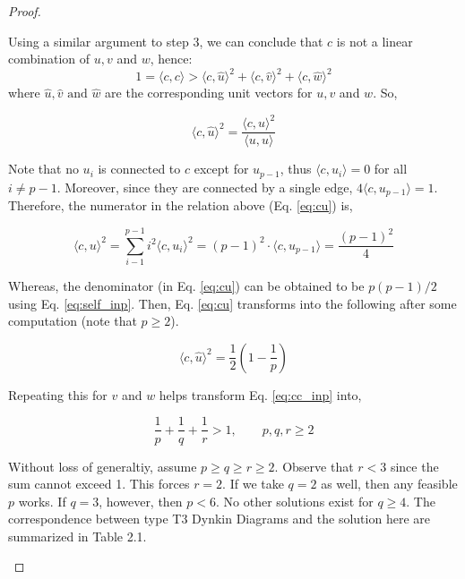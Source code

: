 \begin{proof}
\begin{enumerate}
        Using a similar argument to step 3, we can conclude that $c$ is not a linear combination of $u, v$ and $w$, hence:
        \begin{equation}
            \label{eq:cc_inp}
            1 = \langle c, c \rangle >  \langle c, \hat u \rangle^2 + \langle c, \hat v\rangle^2 + \langle c, \hat w \rangle^2
        \end{equation}
        where $\hat u, \hat v \text{ and } \hat w$ are the corresponding unit vectors for $u, v$ and $w$. So, 

        \begin{equation}
            \label{eq:cu}
            \langle c, \hat u \rangle^2 = \frac{\langle c, u \rangle^2}{\langle u, u \rangle}
        \end{equation}

        Note that no $u_i$ is connected to $c$ except for $u_{p-1}$, thus $ \langle c, u_i \rangle = 0$ for all $i \not= p-1$.
        Moreover, since they are connected by a single edge, $4 \langle c, u_{p-1} \rangle = 1$. Therefore, the numerator in
        the relation above (Eq. \ref{eq:cu}) is,

        \begin{equation*}
            \langle c, u \rangle ^2 = \sum_{i-1}^{p-1} i^2 \langle c, u_i \rangle^2 = (p-1)^2 \cdot \langle c, u_{p-1} \rangle = \frac{(p-1)^2}{4}
        \end{equation*}

        Whereas, the denominator (in Eq. \ref{eq:cu}) can be obtained to be $p(p-1) /2$ using Eq. \ref{eq:self_inp}. Then, 
        Eq. \ref{eq:cu} transforms into the following after some computation (note that $p \geq 2$).

        \begin{equation*}
            \langle c, \hat u \rangle^2 = \frac{1}{2} \left(1 - \frac{1}{p} \right)
        \end{equation*}

        Repeating this for $v$ and $w$ helps transform Eq. \ref{eq:cc_inp} into,

        \begin{equation}
            \label{eq:ineq}
            \frac{1}{p} + \frac{1}{q} + \frac{1}{r} > 1, \quad\quad p,q,r \geq 2
        \end{equation}

        Without loss of generaltiy, assume $p \geq q \geq r \geq 2$. Observe that $r < 3$ since the sum cannot exceed 1. This forces
        $r = 2$. If we take $q=2$ as well, then any feasible $p$ works. If $q=3$, however, then $p < 6$. No other solutions exist for
        $q \geq 4$. The correspondence between type T3 Dynkin Diagrams and the solution here are summarized in Table 2.1.


\end{enumerate}
\end{proof}
